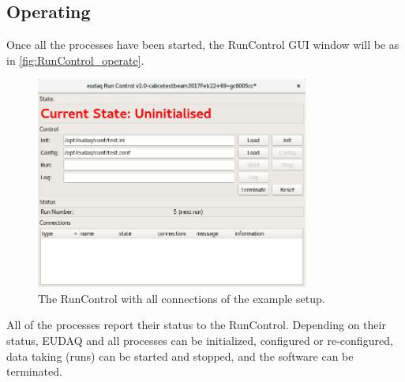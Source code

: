 \subsection{Operating}
Once all the processes have been started, the RunControl GUI window will be as in \autoref{fig:RunControl_operate}.
\begin{figure}[htb]
  \begin{center}
    \includegraphics[width=0.8\textwidth]{src/images/RunControl}
    \caption{The RunControl with all connections of the example setup.}
    \label{fig:RunControl_operate}
  \end{center}
\end{figure}

All of the processes report their status to the RunControl.
Depending on their status, EUDAQ and all processes can be initialized, configured or re-configured, data taking (runs) can be started and stopped, and the software can be terminated.

